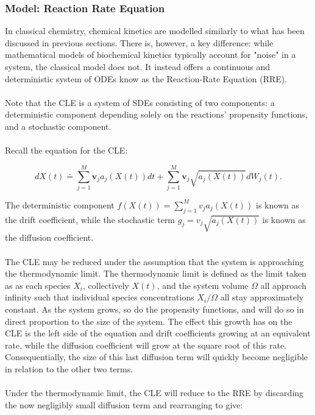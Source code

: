 \documentclass[ugrad,lot,lof,openright,11pt,oneside,onehalfspace]{RUthesis}
\begin{document}
			\subsubsection{Model: Reaction Rate Equation}

				In classical chemistry, chemical kinetics are modelled similarly to what has been discussed in previous sections. There is, however, a key difference: while mathematical models of biochemical kinetics typically account for "noise" in a system, the classical model does not. It instead offers a continuous and deterministic system of ODEs know as the Reaction-Rate Equation (RRE).\\
				\\
				Note that the CLE is a system of SDEs consisting of two components: a deterministic component depending solely on the reactions' propensity functions, and a stochastic component.\\
				\\
				Recall the equation for the CLE:

				\begin{equation*}
				dX(t) \doteq \sum\limits_{j=1}^{M} \mathbf{v}_j a_j(X(t))dt + \sum\limits_{j=1}^{M} \mathbf{v}_j \sqrt{a_j(X(t))} dW_j(t).
				\end{equation*}

				\noindent
				The deterministic component $f(X(t)) = \sum_{j=1}^M v_j a_j(X(t))$ is known as the drift coefficient, while the stochastic term $g_j = v_j \sqrt{a_j(X(t))}$ is known as the diffusion coefficient.\\
				\\
				The CLE may be reduced under the assumption that the system is approaching the thermodynamic limit. The thermodynamic limit is defined as the limit taken as as each species $X_i$, collectively $X(t)$, and the system volume $\Omega$ all approach infinity such that individual species concentrations $X_i/\Omega$ all stay approximately constant. As the system grows, so do the propensity functions, and will do so in direct proportion to the size of the system. The effect this growth has on the CLE is the left side of the equation and drift coefficients growing at an equivalent rate, while the diffusion coefficient will grow at the square root of this rate. Consequentially, the size of this last diffusion term will quickly become negligible in relation to the other two terms.\\
				\\
				Under the thermodynamic limit, the CLE will reduce to the RRE by discarding the now negligibly small diffusion term and rearranging to give:
\end{document}
